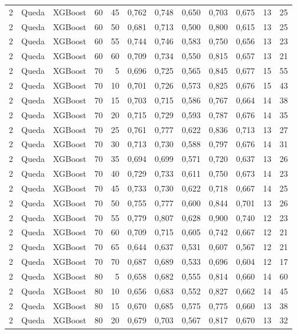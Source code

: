 \begin{longtable}{@{}rllrrrrrrrrr@{}}
2 & Queda & XGBoost & 60 & 45 & 0,762 & 0,748 & 0,650 & 0,703 & 0,675 & 13 & 25 \\
2 & Queda & XGBoost & 60 & 50 & 0,681 & 0,713 & 0,500 & 0,800 & 0,615 & 13 & 25 \\
2 & Queda & XGBoost & 60 & 55 & 0,744 & 0,746 & 0,583 & 0,750 & 0,656 & 13 & 23 \\
2 & Queda & XGBoost & 60 & 60 & 0,709 & 0,734 & 0,550 & 0,815 & 0,657 & 13 & 21 \\
2 & Queda & XGBoost & 70 & 5 & 0,696 & 0,725 & 0,565 & 0,845 & 0,677 & 15 & 55 \\
2 & Queda & XGBoost & 70 & 10 & 0,701 & 0,726 & 0,573 & 0,825 & 0,676 & 15 & 43 \\
2 & Queda & XGBoost & 70 & 15 & 0,703 & 0,715 & 0,586 & 0,767 & 0,664 & 14 & 38 \\
2 & Queda & XGBoost & 70 & 20 & 0,715 & 0,729 & 0,593 & 0,787 & 0,676 & 14 & 35 \\
2 & Queda & XGBoost & 70 & 25 & 0,761 & 0,777 & 0,622 & 0,836 & 0,713 & 13 & 27 \\
2 & Queda & XGBoost & 70 & 30 & 0,713 & 0,730 & 0,588 & 0,797 & 0,676 & 14 & 31 \\
2 & Queda & XGBoost & 70 & 35 & 0,694 & 0,699 & 0,571 & 0,720 & 0,637 & 13 & 26 \\
2 & Queda & XGBoost & 70 & 40 & 0,729 & 0,733 & 0,611 & 0,750 & 0,673 & 14 & 23 \\
2 & Queda & XGBoost & 70 & 45 & 0,733 & 0,730 & 0,622 & 0,718 & 0,667 & 14 & 25 \\
2 & Queda & XGBoost & 70 & 50 & 0,755 & 0,777 & 0,600 & 0,844 & 0,701 & 13 & 26 \\
2 & Queda & XGBoost & 70 & 55 & 0,779 & 0,807 & 0,628 & 0,900 & 0,740 & 12 & 23 \\
2 & Queda & XGBoost & 70 & 60 & 0,709 & 0,715 & 0,605 & 0,742 & 0,667 & 12 & 21 \\
2 & Queda & XGBoost & 70 & 65 & 0,644 & 0,637 & 0,531 & 0,607 & 0,567 & 12 & 21 \\
2 & Queda & XGBoost & 70 & 70 & 0,687 & 0,689 & 0,533 & 0,696 & 0,604 & 12 & 17 \\
2 & Queda & XGBoost & 80 & 5 & 0,658 & 0,682 & 0,555 & 0,814 & 0,660 & 14 & 60 \\
2 & Queda & XGBoost & 80 & 10 & 0,656 & 0,683 & 0,552 & 0,827 & 0,662 & 14 & 45 \\
2 & Queda & XGBoost & 80 & 15 & 0,670 & 0,685 & 0,575 & 0,775 & 0,660 & 13 & 38 \\
2 & Queda & XGBoost & 80 & 20 & 0,679 & 0,703 & 0,567 & 0,817 & 0,670 & 13 & 32 \\

\end{longtable}
